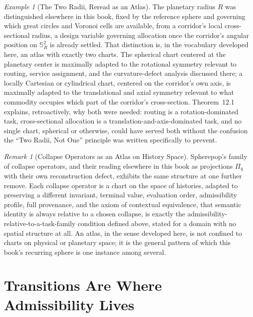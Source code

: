 \documentclass[11pt,fleqn]{book}
\numberwithin{equation}{chapter}
\theoremstyle{plain}
\theoremstyle{definition}
\theoremstyle{remark}
\newtheorem{remark}[theorem]{Remark}
\newtheorem{example}[theorem]{Example}
\newcommand{\Sphere}{\mathbb{S}^{2}}
\providecommand{\enquote}[1]{``#1''}
\begin{document}
\begin{example}[The Two Radii, Reread as an Atlas]
The planetary radius \(R\) was distinguished elsewhere in this book, fixed by the reference sphere and governing which great circles and Voronoi cells are available, from a corridor's local cross-sectional radius, a design variable governing allocation once the corridor's angular position on \(\Sphere_R\) is already settled. That distinction is, in the vocabulary developed here, an atlas with exactly two charts. The spherical chart centered at the planetary center is maximally adapted to the rotational symmetry relevant to routing, service assignment, and the curvature-defect analysis discussed there; a locally Cartesian or cylindrical chart, centered on the corridor's own axis, is maximally adapted to the translational and axial symmetry relevant to what commodity occupies which part of the corridor's cross-section. Theorem~12.1 explains, retroactively, why both were needed: routing is a rotation-dominated task, cross-sectional allocation is a translation-and-axis-dominated task, and no single chart, spherical or otherwise, could have served both without the confusion the \enquote{Two Radii, Not One} principle was written specifically to prevent.
\end{example}

\begin{remark}[Collapse Operators as an Atlas on History Space]
Spherepop's family of collapse operators, and their reading elsewhere in this book as projections \(\Pi_q\) with their own reconstruction defect, exhibits the same structure at one further remove. Each collapse operator is a chart on the space of histories, adapted to preserving a different invariant, terminal value, evaluation order, admissibility profile, full provenance, and the axiom of contextual equivalence, that semantic identity is always relative to a chosen collapse, is exactly the admissibility-relative-to-a-task-family condition defined above, stated for a domain with no spatial structure at all. An atlas, in the sense developed here, is not confined to charts on physical or planetary space; it is the general pattern of which this book's recurring sphere is one instance among several.
\end{remark}

\section{Transitions Are Where Admissibility Lives}
\end{document}
